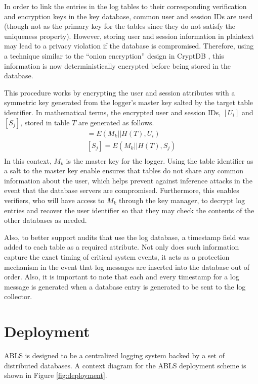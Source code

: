 \documentclass{sig-alternate}
\begin{document}
In order to link the entries in the log tables to their corresponding verification and encryption keys in the key database,
common user and session IDs are used (though not as the primary key for the tables since they do not satisfy
the uniqueness property). However, storing user and session information in plaintext may lead to a privacy violation
if the database is compromised. Therefore, using a technique similar to the ``onion encryption'' design in
CryptDB \cite{Popa2012-CryptDB}, this information is now deterministically encrypted before being stored in the database.

This procedure works by encrypting the user and session attributes with a symmetric key generated
from the logger's master key salted by the target table identifier. In mathematical
terms, the encrypted user and session IDs, $[U_i]$ and $[S_j]$, stored in table $T$ are generated as follows.
\begin{align*}
[U_i] = E(M_k || H(T), U_i) \\
[S_j] = E(M_k || H(T), S_j) \\
\end{align*}
In this context, $M_k$ is the master key for the logger. Using the table identifier as a salt to the master key 
enable ensures that tables do not share any common information about the user, which helps prevent against 
inference attacks in the event that the database servers are compromised. Furthermore, this enables verifiers,
who will have access to $M_k$ through the key manager, to decrypt log entries and recover the user identifier 
so that they may check the contents of the other databases as needed.

Also, to better support audits that use the log database, a timestamp field was added to each table as a required
attribute. Not only does such information capture the exact timing of critical system events, it acts as a protection
mechanism in the event that log messages are inserted into the database out of order. Also, it is important to note that
each and every timestamp for a log message is generated when a database entry is generated to be sent to the log 
collector. 

\section{Deployment}
\label{sec:deployment}
ABLS is designed to be a centralized logging system backed by a set of distributed databases. A context
diagram for the ABLS deployment scheme is shown in Figure \ref{fig:deployment}.
\end{document}
